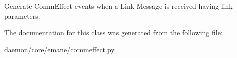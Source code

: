 \begin{DoxyVerb}Generate CommEffect events when a Link Message is received having
link parameters.
\end{DoxyVerb}
 

The documentation for this class was generated from the following file\+:\begin{DoxyCompactItemize}
\item 
daemon/core/emane/commeffect.\+py\end{DoxyCompactItemize}
